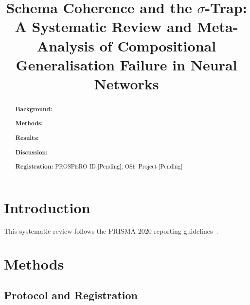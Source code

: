 

\title{Schema Coherence and the $\sigma$-Trap: A Systematic Review and Meta-Analysis of Compositional Generalisation Failure in Neural Networks}

\author*[1]{ }



\begin{abstract}
\textbf{Background:} 

\textbf{Methods:} 

\textbf{Results:} 

\textbf{Discussion:} 

\textbf{Registration:} PROSPERO ID [Pending]; OSF Project [Pending]
\end{abstract}

\maketitle


\section{Introduction}\label{sec:introduction}


This systematic review follows the PRISMA 2020 reporting guidelines~\cite{page2021prisma2020}.

\section{Methods}\label{sec:methods}


\subsection{Protocol and Registration}\label{sec:protocol}

